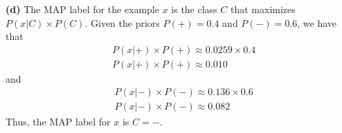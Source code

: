 \documentclass[leqno]{article}
\begin{document}
\noindent \textbf{(d)} The MAP label for the example $x$ is the class $C$
that maximizes $P(x|C) \times P(C)$. Given the priors $P(+) = 0.4$ and
$P(-) = 0.6$, we have that
\begin{equation*}
\begin{split}
&P(x|+) \times P(+) \approx 0.0259 \times 0.4
\\
&P(x|+) \times P(+) \approx 0.010
\end{split}
\end{equation*}  
and
\begin{equation*}
\begin{split}
&P(x|-) \times P(-) \approx 0.136 \times 0.6
\\
&P(x|-) \times P(-) \approx 0.082
\end{split}
\end{equation*}
Thus, the MAP label for $x$ is $C = -$.
\end{document}
